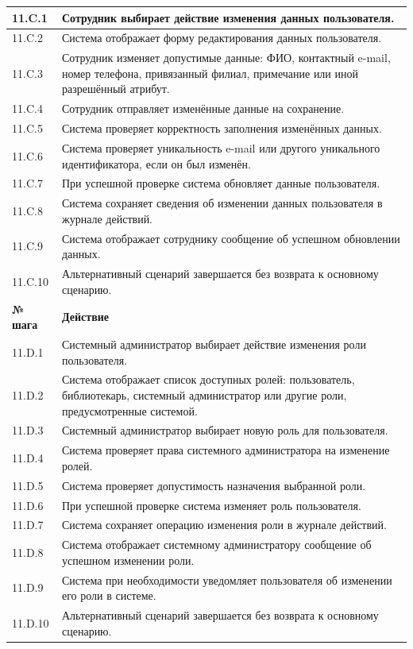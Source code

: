 \documentclass[12pt,a4paper]{article}
\begin{document}
\begin{xltabular}{\textwidth}{
			|>{\raggedright\arraybackslash}p{2.7cm}
			|>{\raggedright\arraybackslash}X|
		}
		11.C.1 & Сотрудник выбирает действие изменения данных пользователя. \\
		\hline
		11.C.2 & Система отображает форму редактирования данных пользователя. \\
		\hline
		11.C.3 & Сотрудник изменяет допустимые данные: ФИО, контактный e-mail,
		номер телефона, привязанный филиал, примечание или иной
		разрешённый атрибут. \\
		\hline
		11.C.4 & Сотрудник отправляет изменённые данные на сохранение. \\
		\hline
		11.C.5 & Система проверяет корректность заполнения изменённых данных. \\
		\hline
		11.C.6 & Система проверяет уникальность e-mail или другого уникального
		идентификатора, если он был изменён. \\
		\hline
		11.C.7 & При успешной проверке система обновляет данные пользователя. \\
		\hline
		11.C.8 & Система сохраняет сведения об изменении данных пользователя в
		журнале действий. \\
		\hline
		11.C.9 & Система отображает сотруднику сообщение об успешном обновлении
		данных. \\
		\hline
		11.C.10 & Альтернативный сценарий завершается без возврата к основному
		сценарию. \\
		\hline
		
		
		\textbf{№ шага} & \textbf{Действие} \\
		\hline
		
		11.D.1 & Системный администратор выбирает действие изменения роли
		пользователя. \\
		\hline
		11.D.2 & Система отображает список доступных ролей: пользователь,
		библиотекарь, системный администратор или другие роли,
		предусмотренные системой. \\
		\hline
		11.D.3 & Системный администратор выбирает новую роль для пользователя. \\
		\hline
		11.D.4 & Система проверяет права системного администратора на изменение
		ролей. \\
		\hline
		11.D.5 & Система проверяет допустимость назначения выбранной роли. \\
		\hline
		11.D.6 & При успешной проверке система изменяет роль пользователя. \\
		\hline
		11.D.7 & Система сохраняет операцию изменения роли в журнале действий. \\
		\hline
		11.D.8 & Система отображает системному администратору сообщение об
		успешном изменении роли. \\
		\hline
		11.D.9 & Система при необходимости уведомляет пользователя об изменении его
		роли в системе. \\
		\hline
		11.D.10 & Альтернативный сценарий завершается без возврата к основному
		сценарию. \\
		\hline
		

\end{xltabular}
\end{document}
